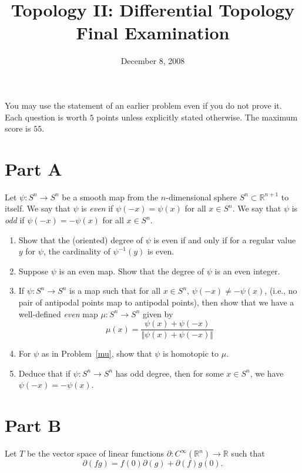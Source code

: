 \documentclass[12pt]{article}
\newcommand{\R}{\mathbb{R}}
\newcommand{\del}{\partial}
\begin{document}
\title{Topology II: Differential Topology\\Final Examination} 
\date{December 8, 2008}
\maketitle


You may use the statement of an earlier problem even if you do not prove it. Each question is worth $5$ points unless explicitly stated otherwise. The maximum score is $55$.

\section*{Part A}

Let $\psi:S^n\to S^n$ be a smooth map from the $n$-dimensional sphere $S^n\subset \R^{n+1}$ to itself. We say that $\psi$ is \emph{even} if $\psi(-x)=\psi(x)$ for all $x\in S^n$. We say that $\psi$ is \emph{odd} if $\psi(-x)=-\psi(x)$ for all $x\in S^n$.

\begin{enumerate}

\item Show that the (oriented) degree of $\psi$ is even if and only if for a regular value $y$ for $\psi$, the cardinality of $\psi^{-1}(y)$ is even.
\item Suppose $\psi$ is an even map. Show that the degree of $\psi$ is an even integer.
\item\label{mu} If $\psi:S^n\to S^n$ is a map such that for all $x\in S^n$, $\psi(-x)\neq -\psi(x)$, (i.e., no pair of antipodal points map to antipodal points), then show that we have a well-defined \emph{even} map $\mu:S^n\to S^n$ given by
$$\mu(x)=\frac{\psi(x)+\psi(-x)}{\Vert\psi(x)+\psi(-x) \Vert}$$
\item For $\psi$ as in Problem~\ref{mu}, show that $\psi$ is homotopic to $\mu$.
\item Deduce that if $\psi:S^n\to S^n$ has odd degree, then for some $x\in S^n$, we have $\psi(-x)=-\psi(x)$.

\end{enumerate}

\section*{Part B}

Let $T$ be the vector space of linear functions $\del:C^\infty(\R^n)\to\R$ such that 
$$\del(fg)=f(0)\del(g)+\del(f)g(0).$$
\end{document}

